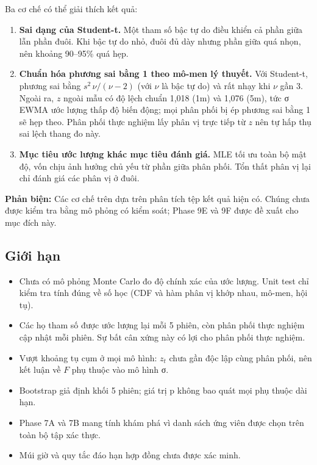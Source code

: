 \documentclass[11pt,a4paper]{article}
\newcommand{\phanbien}[1]{\par\noindent\colorbox{orange!15}{\parbox{\dimexpr\linewidth-2\fboxsep}{\small\textbf{Phản biện:} #1}}\par}
\begin{document}
Ba cơ chế có thể giải thích kết quả:
\begin{enumerate}[nosep]
\item \textbf{Sai dạng của Student-t.} Một tham số bậc tự do điều khiển cả phần giữa lẫn phần đuôi. Khi bậc tự do nhỏ, đuôi đủ dày nhưng phần giữa quá nhọn, nên khoảng 90--95\% quá hẹp.
\item \textbf{Chuẩn hóa phương sai bằng 1 theo mô-men lý thuyết.} Với Student-t, phương sai bằng $s^2\,\nu/(\nu-2)$ (với $\nu$ là bậc tự do) và rất nhạy khi $\nu$ gần 3. Ngoài ra, $z$ ngoài mẫu có độ lệch chuẩn 1,018 (1m) và 1,076 (5m), tức σ EWMA ước lượng thấp độ biến động; mọi phân phối bị ép phương sai bằng 1 sẽ hẹp theo. Phân phối thực nghiệm lấy phân vị trực tiếp từ $z$ nên tự hấp thụ sai lệch thang đo này.
\item \textbf{Mục tiêu ước lượng khác mục tiêu đánh giá.} MLE tối ưu toàn bộ mật độ, vốn chịu ảnh hưởng chủ yếu từ phần giữa phân phối. Tổn thất phân vị lại chỉ đánh giá các phân vị ở đuôi.
\end{enumerate}

\phanbien{Các cơ chế trên dựa trên phân tích tệp kết quả hiện có. Chúng chưa được kiểm tra bằng mô phỏng có kiểm soát; Phase 9E và 9F được đề xuất cho mục đích này.}

\subsection{Giới hạn}

\begin{itemize}[nosep]
\item Chưa có mô phỏng Monte Carlo đo độ chính xác của ước lượng. Unit test chỉ kiểm tra tính đúng về số học (CDF và hàm phân vị khớp nhau, mô-men, hội tụ).
\item Các họ tham số được ước lượng lại mỗi 5 phiên, còn phân phối thực nghiệm cập nhật mỗi phiên. Sự bất cân xứng này có lợi cho phân phối thực nghiệm.
\item Vượt khoảng tụ cụm ở mọi mô hình: $z_t$ chưa gần độc lập cùng phân phối, nên kết luận về $F$ phụ thuộc vào mô hình σ.
\item Bootstrap giả định khối 5 phiên; giá trị p không bao quát mọi phụ thuộc dài hạn.
\item Phase 7A và 7B mang tính khám phá vì danh sách ứng viên được chọn trên toàn bộ tập xác thực.
\item Múi giờ và quy tắc đáo hạn hợp đồng chưa được xác minh.
\end{itemize}
\end{document}
